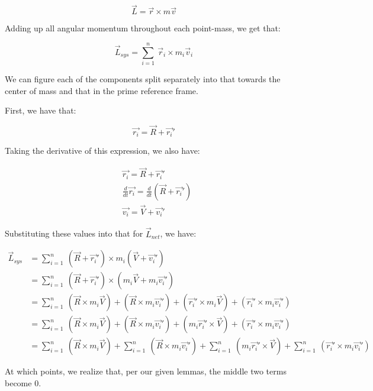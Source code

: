 \documentclass[letterpaper]{article}
\begin{document}
\begin{equation}
   \vec{L} = \vec{r} \times m\vec{v} 
\end{equation}

Adding up all angular momentum throughout each point-mass, we get that:

\begin{equation}
   \vec{L}_{sys} = \sum_{i=1}^n\ \vec{r}_i \times m_i\vec{v}_i
\end{equation}

We can figure each of the components split separately into that towards the center of mass and that in the prime reference frame.

First, we have that:

\begin{equation}
   \vec{r_i} = \vec{R} + \vec{r_i}' 
\end{equation}

Taking the derivative of this expression, we also have:

\begin{align}
    &\vec{r_i} = \vec{R} + \vec{r_i}' \\
&\frac{d}{dt}\vec{r_i} = \frac{d}{dt} (\vec{R} + \vec{r_i}')\\
&\vec{v_i} = \vec{V} + \vec{v_i}'
\end{align}

Substituting these values into that for \(\vec{L}_{net}\), we have:

\begin{align}
 \vec{L}_{sys} &= \sum_{i=1}^n\ (\vec{R} + \vec{r_i}') \times m_i(\vec{V} + \vec{v_i}')\\
&= \sum_{i=1}^n\ (\vec{R} + \vec{r_i}') \times (m_i\vec{V} + m_i\vec{v_i}')\\
&= \sum_{i=1}^n\ (\vec{R} \times m_i\vec{V}) + (\vec{R} \times m_i\vec{v_i}') + (\vec{r_i}' \times m_i\vec{V}) + (\vec{r_i}' \times m_i\vec{v_i}')\\
&= \sum_{i=1}^n\ (\vec{R} \times m_i\vec{V}) + (\vec{R} \times m_i\vec{v_i}') + (m_i\vec{r_i}' \times \vec{V}) + (\vec{r_i}' \times m_i\vec{v_i}')\\
&= \sum_{i=1}^n\ (\vec{R} \times m_i\vec{V}) +\sum_{i=1}^n\  (\vec{R} \times m_i\vec{v_i}') +\sum_{i=1}^n\  (m_i\vec{r_i}' \times \vec{V}) +\sum_{i=1}^n\  (\vec{r_i}' \times m_i\vec{v_i}')
\end{align}

At which points, we realize that, per our given lemmas, the middle two terms become \(0\).
\end{document}
